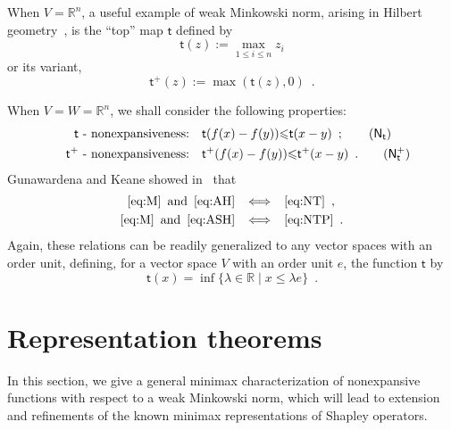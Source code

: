 \documentclass[a4paper,11pt]{amsart}
\theoremstyle{definition}
\theoremstyle{remark}
\begin{document}
When $V={\mathbb{R}}^n$, a useful example of weak Minkowski norm, arising in Hilbert geometry~\cite{PT14}, is the ``top'' map ${\mathsf{t}}$
defined by
\[ {\mathsf{t}}(z):= \max_{1 {\leqslant} i {\leqslant} n} z_i
\]
or its variant, 
\[ {\mathsf{t}}^+(z) := \max({\mathsf{t}}(z),0)
  \enspace.
\]

When $V=W={\mathbb{R}}^n$, we shall consider the following properties:
\begin{align*}
  && \text{${\mathsf{t}}$ - nonexpansiveness:} \quad & {\mathsf{t}} (f(x)-f(y)) {\leqslant} {\mathsf{t}} (x-y) \enspace ; \tag{$\mathsf{N}_{\mathsf{t}}$} \label{eq:NT}\\
  && \text{${\mathsf{t}}^+$ - nonexpansiveness:} \quad & {\mathsf{t}}^+ (f(x)-f(y)) {\leqslant} {\mathsf{t}}^+ (x-y) \enspace . \tag{$\mathsf{N}^+_{\mathsf{t}}$} \label{eq:NTP}
\end{align*}
Gunawardena and Keane showed in~\cite{GK95} that
\begin{align*}
  \eqref{eq:M} \enspace \text{and} \enspace \eqref{eq:AH} \enspace & \iff \enspace \eqref{eq:NT} \enspace , \\
  \eqref{eq:M} \enspace \text{and} \enspace \eqref{eq:ASH} \enspace & \iff \enspace \eqref{eq:NTP} \enspace .
\end{align*}
Again, these relations can be readily generalized to any vector spaces with an order unit, defining, for a vector space $V$ with an order unit ${e}$, the function ${\mathsf{t}}$ by
\begin{equation}
  \label{eq:Top}
  {\mathsf{t}}(x) = \inf \{ \lambda \in {\mathbb{R}} \mid x {\leqslant} \lambda {e} \} \enspace.
\end{equation}

\section{Representation theorems}

In this section, we give a general minimax characterization of nonexpansive functions with respect to a weak Minkowski norm, which will lead to extension
and refinements of the known minimax representations of Shapley operators.
\end{document}
